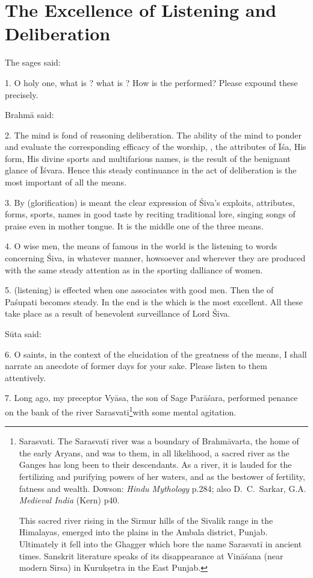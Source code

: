 \chapter{The Excellence of Listening and Deliberation}

The sages said:

1. O holy one, what is ? what is ? How is the 
performed? Please expound these precisely.

Brahmā said:

2. The mind is fond of reasoning deliberation. The ability of the mind to ponder
and evaluate the corresponding efficacy of the worship, ,
the attributes of Īśa, His form, His divine sports and multifarious names, is
the result of the benignant glance of Īśvara. Hence this steady continuance in
the act of deliberation is the most important of all the means.

3. By  (glorification) is meant the clear expression of Śiva’s
exploits, attributes, forms, sports, names \etc in good taste by reciting
traditional lore, singing songs of praise even in mother tongue. It is the
middle one of the three means.

4. O wise men, the means of  famous in the world is the listening
to words concerning Śiva, in whatever manner, howsoever and wherever they are
produced with the same steady attention as in the sporting dalliance of women.

5.  (listening) is effected when one associates with good men. Then
the  of Paśupati becomes steady. In the end is the  which
is the most excellent. All these take place as a result of benevolent
surveillance of Lord Śiva.

Sūta said:

6. O saints, in the context of the elucidation of the greatness of the means,
I shall narrate an anecdote of former days for your sake. Please listen to them
attentively.

7. Long ago, my preceptor Vyāsa, the son of Sage Parāśara, performed penance on
the bank of the river Sarasvatī\footnote{Sarasvati. The Sarasvatī river was a
boundary of Brahmāvarta, the home of the early Aryans, and was to them, in all
likelihood, a sacred river as the Ganges has long been to their descendants. As
a river, it is lauded for the fertilizing and purifying powers of her waters,
and as the bestower of fertility, fatness and wealth. Dowson: \emph{Hindu
Mythology} p.284; also D.~C.~Sarkar, G.A. \emph{Medieval India} (Kern) p40.

This sacred river rising in the Sirmur hills of the Sivalik range in
the Himalayas, emerged into the plains in the Ambala district, Punjab.
Ultimately it fell into the Ghagger which bore the name Sarasvatī in ancient
times. Sanskrit literature speaks of its disappearance at Vināśana (near modern
Sirsa) in Kurukṣetra in the East Punjab.}with some mental agitation.

